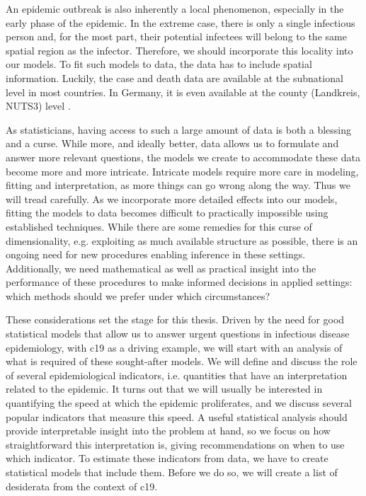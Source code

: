 An epidemic outbreak is also inherently a local phenomenon, especially in the early phase of the epidemic. In the extreme case, there is only a single infectious person and, for the most part, their potential infectees will belong to the same spatial region as the infector. Therefore, we should incorporate this locality into our models. To fit such models to data, the data has to include spatial information. Luckily, the case and death data are available at the subnational level in most countries. In Germany, it is even available at the county (Landkreis, NUTS3) level \citep{RobertKoch-Institut2022SARSCoV2}. 

As statisticians, having access to such a large amount of data is both a blessing and a curse. While more, and ideally better, data allows us to formulate and answer more relevant questions, the models we create to accommodate these data become more and more intricate. Intricate models require more care in modeling, fitting and interpretation, as more things can go wrong along the way. Thus we will tread carefully. As we incorporate more detailed effects into our models, fitting the models to data becomes difficult to practically impossible using established techniques. While there are some remedies for this curse of dimensionality, e.g. exploiting as much available structure as possible, there is an ongoing need for new procedures enabling inference in these settings. Additionally, we need mathematical as well as practical insight into the performance of these procedures to make informed decisions in applied settings: which methods should we prefer under which circumstances?

These considerations set the stage for this thesis. Driven by the need for good statistical models that allow us to answer urgent questions in infectious disease epidemiology, with \acrshort{c19} as a driving example, we will start with an analysis of what is required of these sought-after models. We will define and discuss the role of several epidemiological indicators, i.e. quantities that have an interpretation related to the epidemic. It turns out that we will usually be interested in quantifying the speed at which the epidemic proliferates, and we discuss several popular indicators that measure this speed. A useful statistical analysis should provide interpretable insight into the problem at hand, so we focus on how straightforward this interpretation is, giving recommendations on when to use which indicator. To estimate these indicators from data, we have to create statistical models that include them. Before we do so, we will create a list of desiderata from the context of \acrshort{c19}. 


